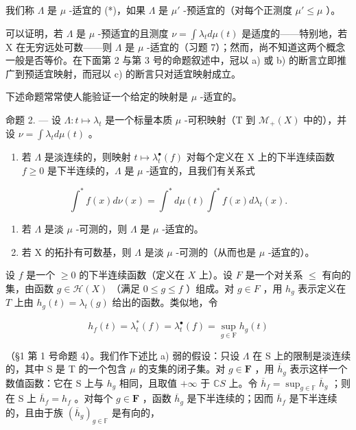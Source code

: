 我们称 \(\Lambda\) 是 \(\mu\) -适宜的 (*)，如果 \(\Lambda\) 是 \(\mu'\) -预适宜的（对每个正测度 \(\mu' \leqslant \mu\) ）。

可以证明，若 \(\Lambda\) 是 \(\mu\) -预适宜的且测度 \(\nu = \int \lambda_{t} d\mu(t)\) 是适度的——特别地，若 X 在无穷远处可数——则 \(\Lambda\) 是 \(\mu\) -适宜的（习题 7）；然而，尚不知道这两个概念一般是否等价。在下面第 2 与第 3 号的命题叙述中，冠以 a) 或 b) 的断言立即推广到预适宜映射，而冠以 c) 的断言只对适宜映射成立。

下述命题常常使人能验证一个给定的映射是 \(\mu\) -适宜的。

命题 2. --- 设 \(\Lambda : t \mapsto \lambda_t\) 是一个标量本质 \(\mu\) -可积映射（T 到 \(\mathcal{M}_{+}(X)\) 中的），并设 \(\nu = \int \lambda_t d\mu(t)\) 。

\begin{enumerate}
\def\labelenumi{\alph{enumi})}
\tightlist
\item
  若 \(\Lambda\) 是淡连续的，则映射 \(t \mapsto \lambda_t^\bullet(f)\) 对每个定义在 X 上的下半连续函数 \(f \geqslant 0\) 是下半连续的，\(\Lambda\) 是 \(\mu\) -适宜的，且我们有关系式
\end{enumerate}

\[
\int^ {*} f (x) d \nu (x) = \int^ {*} d \mu (t) \int^ {*} f (x) d \lambda_ {t} (x).\tag{5}
\]

\begin{enumerate}
\def\labelenumi{\alph{enumi})}
\setcounter{enumi}{1}
\item
  若 \(\Lambda\) 是淡 \(\mu\) -可测的，则 \(\Lambda\) 是 \(\mu\) -适宜的。
\item
  若 X 的拓扑有可数基，则 \(\Lambda\) 是淡 \(\mu\) -可测的（从而也是 \(\mu\) -适宜的）。
\end{enumerate}

设 \(f\) 是一个 \(\geqslant 0\) 的下半连续函数（定义在 \(X\) 上）。设 \(F\) 是一个对关系 \(\leqslant\) 有向的集，由函数 \(g \in \mathcal{H}(X)\) （满足 \(0 \leqslant g \leqslant f\) ）组成。对 \(g \in F\) ，用 \(h_g\) 表示定义在 \(T\) 上由 \(h_g(t) = \lambda_t(g)\) 给出的函数。类似地，令

\[
h _ {f} (t) = \lambda_ {t} ^ {*} (f) = \lambda_ {t} ^ {\bullet} (f) = \sup _ {g \in \mathrm{F}} h _ {g} (t)
\]

（§1 第 1 号命题 4）。我们作下述比 a) 弱的假设：只设 \(\Lambda\) 在 S 上的限制是淡连续的，其中 S 是 T 的一个包含 \(\mu\) 的支集的闭子集。对 \(g \in \mathbf{F}\) ，用 \(\overline{h}_g\) 表示这样一个数值函数：它在 S 上与 \(h_g\) 相同，且取值 \(+\infty\) 于 \(\mathbb{C}S\) 上。令 \(\overline{h}_f = \sup_{g \in \mathbb{F}} \overline{h}_g\) ；则在 S 上 \(\overline{h}_f = h_f\) 。对每个 \(g \in \mathbf{F}\) ，函数 \(\overline{h}_g\) 是下半连续的；因而 \(\overline{h}_f\) 是下半连续的，且由于族 \((\overline{h}_g)_{g \in \mathbb{F}}\) 是有向的，

